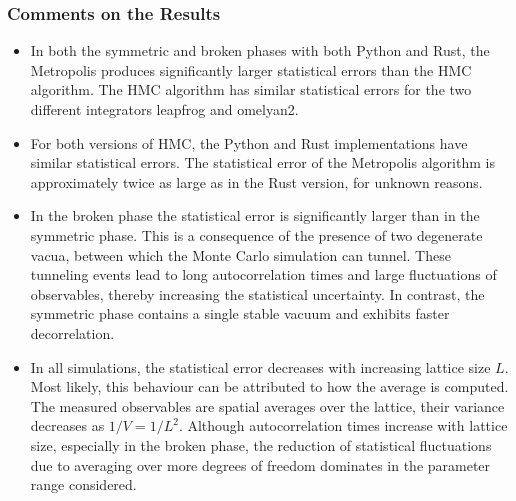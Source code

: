 \subsubsection*{Comments on the Results}
\begin{itemize}
    \item In both the symmetric and broken phases with both Python and Rust, the Metropolis produces significantly larger statistical errors than the HMC algorithm. The HMC algorithm has similar statistical errors for the two different integrators leapfrog and omelyan2. 
    \item For both versions of HMC, the Python and Rust implementations have similar statistical errors. The statistical error of the Metropolis algorithm is approximately twice as large as in the Rust version, for unknown reasons.
    \item In the broken phase the statistical error is significantly larger than in the symmetric phase. This is a consequence of the presence of two degenerate vacua, between which the Monte Carlo simulation can tunnel. These tunneling events lead to long autocorrelation times and large fluctuations of observables, thereby increasing the statistical uncertainty. In contrast, the symmetric phase contains a single stable vacuum and exhibits faster decorrelation.
    \item In all simulations, the statistical error decreases with increasing lattice size $L$. Most likely, this behaviour can be attributed to how the average is computed. The measured observables are spatial averages over the lattice, their variance decreases as $1/V = 1/L^2$. Although autocorrelation times increase with lattice size, especially in the broken phase, the reduction of statistical fluctuations due to averaging over more degrees of freedom dominates in the parameter range considered.
\end{itemize}
